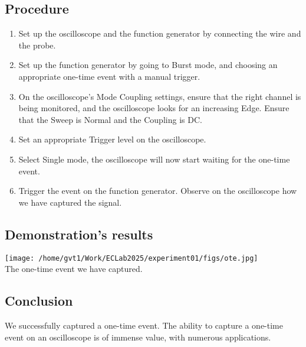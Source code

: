 \documentclass[a4paper,12pt]{article}
\begin{document}
\subsection{Procedure}
\begin{enumerate}
	\item Set up the oscilloscope and the function generator by connecting the wire and the probe.
	\item Set up the function generator by going to Burst mode, and choosing an appropriate one-time event with a manual trigger.
	\item On the oscilloscope's Mode Coupling settings, ensure that the right channel is being monitored, and the oscilloscope looks for an increasing Edge. Ensure that the Sweep is Normal and the Coupling is DC.
	\item Set an appropriate Trigger level on the oscilloscope.
	\item Select Single mode, the oscilloscope will now start waiting for the one-time event.
	\item Trigger the event on the function generator. Observe on the oscilloscope how we have captured the signal.
\end{enumerate}
\subsection{Demonstration's results}
		\begin{center}
			\texttt{[image: /home/gvt1/Work/ECLab2025/experiment01/figs/ote.jpg]}\\
			The one-time event we have captured.
		\end{center}
\subsection{Conclusion}
We successfully captured a one-time event. The ability to capture a one-time event on an oscilloscope is of immense value, with numerous applications.
\end{document}
